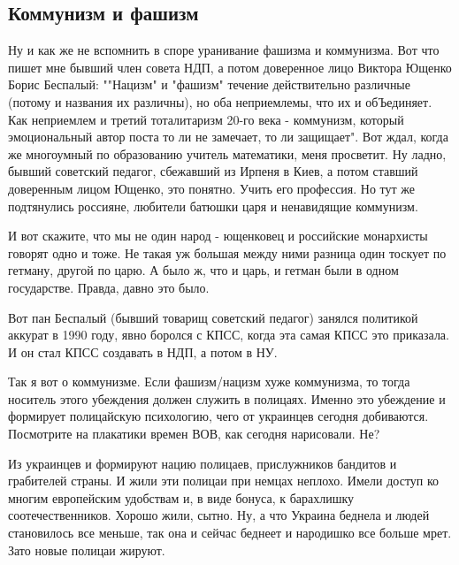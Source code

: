 
 
 

\subsection{Коммунизм и фашизм}


Ну и как же не вспомнить в споре уранивание фашизма и коммунизма. Вот что пишет
мне бывший член совета НДП, а потом доверенное лицо Виктора Ющенко Борис
Беспалый: ""Нацизм" и "фашизм" течение действительно различные (потому и
названия их различны), но оба неприемлемы, что их и обЪединяет. Как неприемлем
и третий тоталитаризм 20-го века - коммунизм, который эмоциональный автор поста
то ли не замечает, то ли защищает". Вот ждал, когда же многоумный по
образованию учитель математики, меня просветит. Ну ладно, бывший советский
педагог, сбежавший из Ирпеня в Киев, а потом ставший доверенным лицом Ющенко,
это понятно. Учить его профессия. Но тут же подтянулись россияне, любители
батюшки царя и ненавидящие коммунизм. 

И вот скажите, что мы не один народ - ющенковец и российские монархисты говорят
одно и тоже. Не такая уж большая между ними разница один тоскует по гетману,
другой по царю. А было ж, что и царь, и гетман были в одном государстве.
Правда, давно это было. 

Вот пан Беспалый (бывший товарищ советский педагог) занялся политикой аккурат в
1990 году, явно боролся с КПСС, когда эта самая КПСС это приказала. И он стал
КПСС создавать в НДП, а потом в НУ.  

Так я вот о коммунизме. Если фашизм/нацизм хуже коммунизма, то тогда носитель этого убеждения должен служить в полицаях. Именно это убеждение и формирует полицайскую психологию, чего от украинцев сегодня добиваются. Посмотрите на плакатики времен ВОВ, как сегодня нарисовали. Не? 

Из украинцев и формируют нацию полицаев, прислужников бандитов и грабителей
страны. И жили эти полицаи при немцах неплохо. Имели доступ ко многим
европейским удобствам и, в виде бонуса, к барахлишку соотечественников. Хорошо
жили, сытно. Ну, а что Украина беднела и людей становилось все меньше, так она
и сейчас беднеет и народишко все больше мрет. Зато новые полицаи жируют. 

